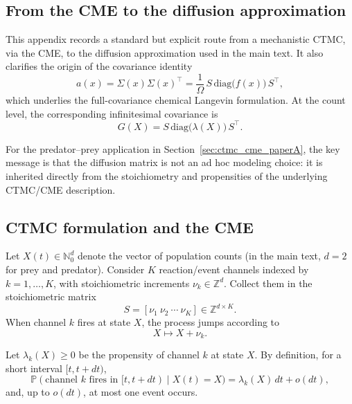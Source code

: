 \documentclass[pdflatex,sn-mathphys-ay]{sn-jnl}
\theoremstyle{thmstyleone}
\theoremstyle{definition}
\theoremstyle{remark}
\begin{document}
\begin{appendices}

\section{From the CME to the diffusion approximation}
\label{app:CME_diffusion}

This appendix records a standard but explicit route from a mechanistic CTMC, via the CME, to the diffusion approximation used in the main text. It also clarifies the origin of the covariance identity
\begin{equation}\label{eq:appA_key}
a(x)=\Sigma(x)\Sigma(x)^\top
=\frac{1}{\Omega}\,S\,\mathrm{diag}\big(f(x)\big)\,S^\top,
\end{equation}
which underlies the full-covariance chemical Langevin formulation. At the count level, the corresponding infinitesimal covariance is
\begin{equation}\label{eq:appA_key_counts}
G(X)=S\,\mathrm{diag}\big(\lambda(X)\big)\,S^\top.
\end{equation}

For the predator--prey application in Section~\ref{sec:ctmc_cme_paperA}, the key message is that the diffusion matrix is not an ad hoc modeling choice: it is inherited directly from the stoichiometry and propensities of the underlying CTMC/CME description.

\subsection{CTMC formulation and the CME}
\label{app:CME_setup}

Let \(X(t)\in\mathbb N_0^d\) denote the vector of population counts (in the main text, \(d=2\) for prey and predator). Consider \(K\) reaction/event channels indexed by \(k=1,\dots,K\), with stoichiometric increments \(\nu_k\in\mathbb Z^d\). Collect them in the stoichiometric matrix
\[
S=[\nu_1\ \nu_2\ \cdots\ \nu_K]\in\mathbb Z^{d\times K}.
\]
When channel \(k\) fires at state \(X\), the process jumps according to
\[
X \longmapsto X+\nu_k.
\]

Let \(\lambda_k(X)\ge 0\) be the propensity of channel \(k\) at state \(X\). By definition, for a short interval \([t,t+dt)\),
\begin{equation}\label{eq:appA_propensity}
\mathbb P(\text{channel \(k\) fires in }[t,t+dt)\mid X(t)=X)
=
\lambda_k(X)\,dt+o(dt),
\end{equation}
and, up to \(o(dt)\), at most one event occurs.


\end{appendices}
\end{document}
